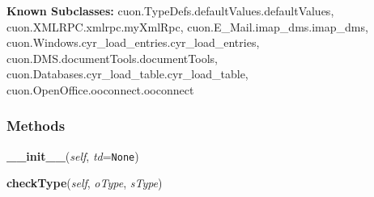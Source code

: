     \label{cuon:Databases:dumps:dumps}
\textbf{Known Subclasses:}
cuon.TypeDefs.defaultValues.defaultValues,
    cuon.XMLRPC.xmlrpc.myXmlRpc,
    cuon.E\_Mail.imap\_dms.imap\_dms,
    cuon.Windows.cyr\_load\_entries.cyr\_load\_entries,
    cuon.DMS.documentTools.documentTools,
    cuon.Databases.cyr\_load\_table.cyr\_load\_table,
    cuon.OpenOffice.ooconnect.ooconnect



  \subsubsection{Methods}

    \label{cuon:Databases:dumps:dumps:__init__}

    \vspace{0.5ex}

\hspace{.8\funcindent}\begin{boxedminipage}{\funcwidth}

    \raggedright \textbf{\_\_init\_\_}(\textit{self}, \textit{td}={\tt None})

\setlength{\parskip}{2ex}
\setlength{\parskip}{1ex}
    \end{boxedminipage}

    \label{cuon:Databases:dumps:dumps:checkType}

    \vspace{0.5ex}

\hspace{.8\funcindent}\begin{boxedminipage}{\funcwidth}

    \raggedright \textbf{checkType}(\textit{self}, \textit{oType}, \textit{sType})

\setlength{\parskip}{2ex}
\setlength{\parskip}{1ex}
    \end{boxedminipage}

